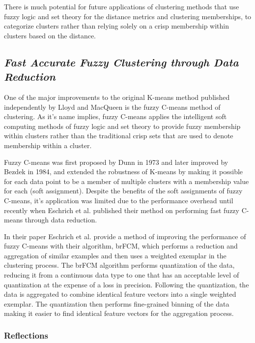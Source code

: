 \documentclass{article}
\begin{document}
There is much potential for future applications of clustering methods that use fuzzy logic and set theory for the distance metrics and clustering memberships, to categorize clusters rather than relying solely on a crisp membership within clusters based on the distance.




\subsection{\emph{Fast Accurate Fuzzy Clustering through Data Reduction}}

One of the major improvements to the original K-means method published independently by Lloyd and MacQueen\cite{lloyd1982least, macqueen1967some} is the fuzzy C-means method of clustering. As it's name implies, fuzzy C-means applies the intelligent soft computing methods of fuzzy logic and set theory to provide fuzzy membership within clusters rather than the traditional crisp sets that are used to denote membership within a cluster.

Fuzzy C-means was first proposed by Dunn in 1973\cite{dunn1973fuzzy} and later improved by Bezdek in 1984\cite{bezdek1984fcm}, and extended the robustness of K-means by making it possible for each data point to be a member of multiple clusters with a membership value for each (soft assignment). Despite the benefits of the soft assignments of fuzzy C-means, it's application was limited due to the performance overhead until recently when Eschrich et al. published their method on performing fast fuzzy C-means through data reduction\cite{eschrich2003fast}.

In their paper Eschrich et al. provide a method of improving the performance of fuzzy C-means with their algorithm, brFCM, which performs a reduction and aggregation of similar examples and then uses a weighted exemplar in the clustering process\cite{eschrich2003fast}. The brFCM algorithm performs quantization of the data, reducing it from a continuous data type to one that has an acceptable level of quantization at the expense of a loss in precision. Following the quantization, the data is aggregated to combine identical feature vectors into a single weighted exemplar. The quantization then performs fine-grained binning of the data making it easier to find identical feature vectors for the aggregation process\cite{eschrich2003fast}.


\subsubsection{Reflections}
\end{document}
